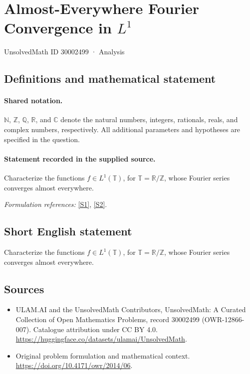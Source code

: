 \documentclass[11pt]{article}
\newcommand{\sref}[2]{\hyperlink{source:#1:#2}{[S#2]}}
\begin{document}
\setcounter{section}{30002498}
\section{\texorpdfstring{Almost-Everywhere Fourier Convergence in $L^{1}$}{Almost-Everywhere Fourier Convergence in L\textasciicircum{}1}}\label{30002499}
{\small UnsolvedMath ID 30002499 · Analysis}
\subsection{Definitions and mathematical statement}

\paragraph{Shared notation.}$\mathbb N$, $\mathbb Z$, $\mathbb Q$, $\mathbb R$, and $\mathbb C$ denote the natural numbers, integers, rationals, reals, and complex numbers, respectively. All additional parameters and hypotheses are specified in the question.


\paragraph{Statement recorded in the supplied source.}
Characterize the functions $f\in L^1(\mathbb T)$, for $\mathbb T=\mathbb R/\mathbb Z$, whose Fourier series converges almost everywhere.
\par\smallskip\textit{Formulation references:} \sref{30002499}{1}, \sref{30002499}{2}.
\subsection{Short English statement}
Characterize the functions $f\in L^1(\mathbb T)$, for $\mathbb T=\mathbb R/\mathbb Z$, whose Fourier series converges almost everywhere.
\subsection{Sources}
\begin{itemize}
\item[\hypertarget{source:30002499:1}{S1}] ULAM.AI and the UnsolvedMath Contributors, UnsolvedMath: A Curated Collection of Open Mathematics Problems, record 30002499 (OWR-12866-007). Catalogue attribution under CC BY 4.0.
\url{https://huggingface.co/datasets/ulamai/UnsolvedMath}.
\item[\hypertarget{source:30002499:2}{S2}] Original problem formulation and mathematical context.
\url{https://doi.org/10.4171/owr/2014/06}.
\end{itemize}
\label{end:30002499}
\end{document}
